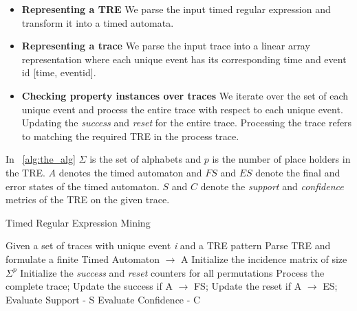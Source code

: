 \documentclass[]{sigplanconf}
\begin{document}
\begin{itemize}
\item \textbf{Representing a TRE} We parse the input timed regular expression and transform it into a timed automata.
\item \textbf{Representing a trace} We parse the input trace into a  linear array representation where each unique event has its corresponding time and event id [time, eventid].
\item \textbf{Checking property instances over traces} We iterate over the set of each unique event and process the entire trace with respect to each unique event. Updating the \emph{success} and \emph{reset} for the entire trace. Processing the trace refers to matching the required TRE in the process trace.
\end{itemize}


In ~\ref{alg:the_alg} $\Sigma$ is the set of alphabets and $p$ is the number of place holders in the TRE. $A$ denotes the timed automaton and $FS$ and $ES$ denote the final and error states of the timed automaton. $S$ and $C$ denote the \emph{support} and \emph{confidence} metrics of the TRE on the given trace.

\begin{algorithm}[h]
\label{alg:the_alg}
     \caption{Timed Regular Expression Mining}
    \begin{algorithmic}[1]
     \Require  Given a set of traces with unique event \emph{i} and a TRE pattern
     \Ensure Parse TRE and formulate a finite Timed Automaton $\rightarrow$ A
     \State Initialize the incidence matrix of size $\Sigma^p$
     \State Initialize the \emph{success} and \emph{reset} counters for all permutations
        \State Process the complete trace;
        \State Update the success if A $\rightarrow$ FS;
        \State Update the reset if A $\rightarrow$ ES;
     \EndFor
     \State Evaluate Support - S
     \State Evaluate Confidence - C
    \end{algorithmic}
\end{algorithm}
\end{document}
